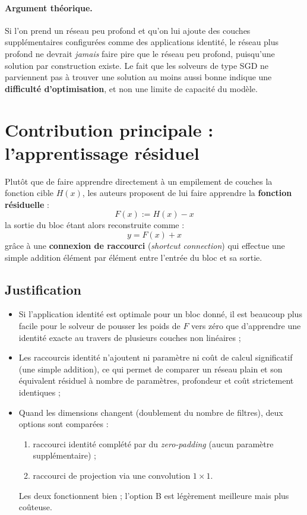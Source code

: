 \documentclass[a4paper,11pt]{article}
\begin{document}
\paragraph{Argument théorique.} Si l'on prend un réseau peu profond et qu'on lui ajoute des couches supplémentaires configurées comme des applications identité, le réseau plus profond ne devrait \emph{jamais} faire pire que le réseau peu profond, puisqu'une solution par construction existe. Le fait que les solveurs de type SGD ne parviennent pas à trouver une solution au moins aussi bonne indique une \textbf{difficulté d'optimisation}, et non une limite de capacité du modèle.

\section{Contribution principale : l'apprentissage résiduel}
Plutôt que de faire apprendre directement à un empilement de couches la fonction cible $H(x)$, les auteurs proposent de lui faire apprendre la \textbf{fonction résiduelle} :
$$F(x) := H(x) - x$$
la sortie du bloc étant alors reconstruite comme :
$$y = F(x) + x$$
grâce à une \textbf{connexion de raccourci} (\emph{shortcut connection}) qui effectue une simple addition élément par élément entre l'entrée du bloc et sa sortie.

\subsection{Justification}
\begin{itemize}
    \item Si l'application identité est optimale pour un bloc donné, il est beaucoup plus facile pour le solveur de pousser les poids de $F$ vers zéro que d'apprendre une identité exacte au travers de plusieurs couches non linéaires ;
    \item Les raccourcis identité n'ajoutent ni paramètre ni coût de calcul significatif (une simple addition), ce qui permet de comparer un réseau plain et son équivalent résiduel à nombre de paramètres, profondeur et coût strictement identiques ;
    \item Quand les dimensions changent (doublement du nombre de filtres), deux options sont comparées :
    \begin{enumerate}
        \item[(A)] raccourci identité complété par du \emph{zero-padding} (aucun paramètre supplémentaire) ;
        \item[(B)] raccourci de projection via une convolution $1\times 1$.
    \end{enumerate}
    Les deux fonctionnent bien ; l'option B est légèrement meilleure mais plus coûteuse.
\end{itemize}
\end{document}
